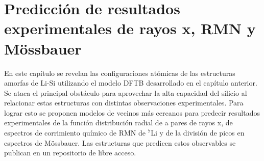 \chapter{Predicción de resultados experimentales de rayos x, RMN y Mössbauer}\label{ch:prediccion}
\thispagestyle{empty}

\vspace{50pt}

\begin{adjustwidth}{50pt}{50pt}
    En este capítulo se revelan las configuraciones atómicas de las estructuras
    amorfas de Li-Si utilizando el modelo DFTB desarrollado en el capítulo 
    anterior. Se ataca el principal obstáculo para aprovechar la alta capacidad 
    del silicio al relacionar estas estructuras con distintas observaciones 
    experimentales. Para lograr esto se proponen modelos de vecinos más 
    cercanos para predecir resultados experimentales de la función 
    distribución radial de a pares de rayos x, de espectros de corrimiento 
    químico de RMN de $^7$Li y de la división de picos en espectros de 
    Mössbauer. Las estructuras que predicen estos observables se publican
    en un repositorio de libre acceso.
\end{adjustwidth}

\clearpage
\newpage
\thispagestyle{empty}
\mbox{}
\newpage








